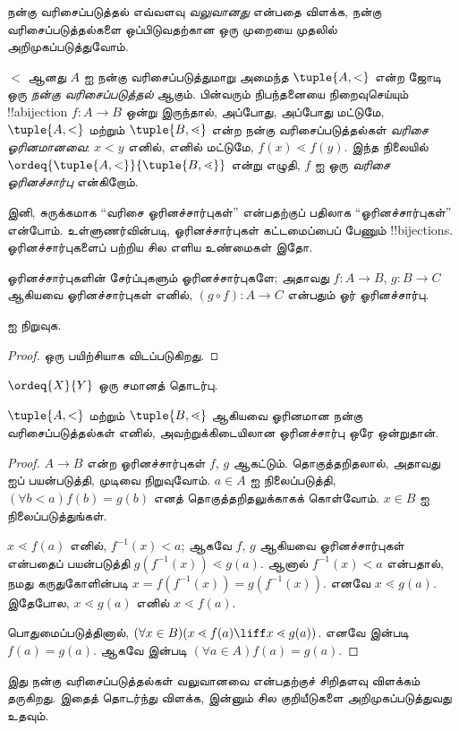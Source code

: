 \documentclass[../../../include/open-logic-section]{subfiles}
\begin{document}

நன்கு வரிசைப்படுத்தல் எவ்வளவு \emph{வலுவானது} என்பதை விளக்க, நன்கு
வரிசைப்படுத்தல்களை ஒப்பிடுவதற்கான ஒரு முறையை முதலில் அறிமுகப்படுத்துவோம்.

\begin{defn}
$<$ ஆனது $A$ ஐ நன்கு வரிசைப்படுத்துமாறு அமைந்த $\tuple{A, <}$ என்ற
ஜோடி ஒரு \emph{நன்கு வரிசைப்படுத்தல்} ஆகும். பின்வரும் நிபந்தனையை
நிறைவுசெய்யும் !!a{bijection} $f \colon A \to B$ ஒன்று இருந்தால்,
அப்போது, அப்போது மட்டுமே, $\tuple{A, <}$ மற்றும் $\tuple{B,
\lessdot}$ என்ற நன்கு வரிசைப்படுத்தல்கள் \emph{வரிசை ஓரினமானவை}:
$x < y$ எனில், எனில் மட்டுமே, $f(x) \lessdot  f(y)$. இந்த நிலையில்
$\ordeq{\tuple{A, <}}{\tuple{B, \lessdot}}$ என்று எழுதி, $f$ ஐ ஒரு
\emph{வரிசை ஓரினச்சார்பு} என்கிறோம்.
\end{defn}
\noindent
இனி, சுருக்கமாக ``வரிசை ஓரினச்சார்புகள்'' என்பதற்குப் பதிலாக
``ஓரினச்சார்புகள்'' என்போம். உள்ளுணர்வின்படி, ஓரினச்சார்புகள் கட்டமைப்பைப்
பேணும் !!{bijection}s. ஓரினச்சார்புகளைப் பற்றிய சில எளிய உண்மைகள் இதோ.

\begin{lem}
ஓரினச்சார்புகளின் சேர்ப்புகளும் ஓரினச்சார்புகளே; அதாவது $f \colon A
\to B$, $g \colon B \to C$ ஆகியவை ஓரினச்சார்புகள் எனில், $(g \circ f)
\colon A \to C$ என்பதும் ஓர் ஓரினச்சார்பு.
\end{lem}
\begin{prob}
	 ஐ நிறுவுக.
\end{prob}
\begin{proof}
ஒரு பயிற்சியாக விடப்படுகிறது.
\end{proof}
\begin{cor}
	$\ordeq{X}{Y}$ ஒரு சமானத் தொடர்பு.
\end{cor}
\begin{prop}
$\tuple{A, <}$ மற்றும் $\tuple{B, \lessdot}$ ஆகியவை ஓரினமான நன்கு
வரிசைப்படுத்தல்கள் எனில், அவற்றுக்கிடையிலான ஓரினச்சார்பு ஒரே ஒன்றுதான்.
\end{prop}

\begin{proof}
$A \to B$ என்ற ஓரினச்சார்புகள் $f$, $g$ ஆகட்டும். தொகுத்தறிதலால்,
அதாவது  ஐப் பயன்படுத்தி, முடிவை நிறுவுவோம்.
$a\in A$ ஐ நிலைப்படுத்தி, $(\forall b < a)f(b) = g(b)$ எனத்
தொகுத்தறிதலுக்காகக் கொள்வோம். $x \in B$ ஐ நிலைப்படுத்துங்கள்.

$x \lessdot f(a)$ எனில், $f^{-1}(x) < a$; ஆகவே $f$, $g$ ஆகியவை
ஓரினச்சார்புகள் என்பதைப் பயன்படுத்தி $g(f^{-1}(x)) \lessdot g(a)$.
ஆனால் $f^{-1}(x) < a$ என்பதால், நமது கருதுகோளின்படி
$x =f(f^{-1}(x)) = g(f^{-1}(x))$. எனவே $x \lessdot g(a)$. இதேபோல,
$x \lessdot g(a)$ எனில் $x \lessdot f(a)$.

பொதுமைப்படுத்தினால், $(\forall x \in B)(x \lessdot f(a) \liff x
\lessdot g(a))$. எனவே
 இன்படி
$f(a) = g(a)$. ஆகவே  இன்படி $(\forall a \in
A)f(a) = g(a)$.
\end{proof}\noindent
இது நன்கு வரிசைப்படுத்தல்கள் வலுவானவை என்பதற்குச் சிறிதளவு விளக்கம்
தருகிறது. இதைத் தொடர்ந்து விளக்க, இன்னும் சில குறியீடுகளை அறிமுகப்படுத்துவது
உதவும்.
\end{document}
